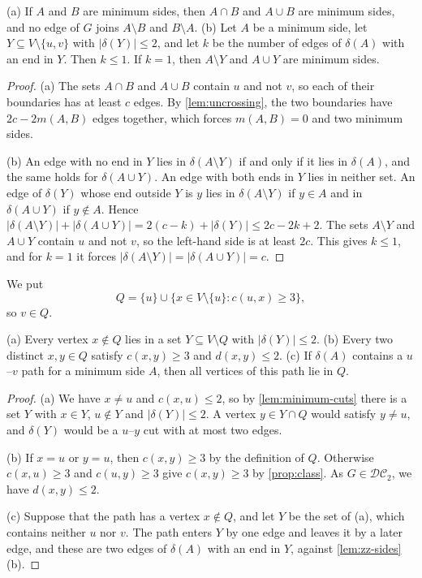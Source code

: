 \documentclass[pdflatex,sn-mathphys-num]{sn-jnl}%
\theoremstyle{thmstyleone}%
\theoremstyle{thmstyletwo}%
\theoremstyle{thmstylethree}%
\newcommand{\DC}{\mathcal{DC}_2}%
\begin{document}
\begin{lemma}
\label{lem:zz-sides}
(a) If $A$ and $B$ are minimum sides, then $A \cap B$ and $A \cup B$ are minimum sides, and no edge of $G$ joins $A \setminus B$ and $B \setminus A$.
(b) Let $A$ be a minimum side, let $Y \subseteq V \setminus \{u, v\}$ with $|\delta(Y)| \leq 2$, and let $k$ be the number of edges of $\delta(A)$ with an end in $Y$.
Then $k \leq 1$.
If $k = 1$, then $A \setminus Y$ and $A \cup Y$ are minimum sides.
\end{lemma}

\begin{proof}
(a) The sets $A \cap B$ and $A \cup B$ contain $u$ and not $v$, so each of their boundaries has at least $c$ edges.
By \cref{lem:uncrossing}, the two boundaries have $2c - 2m(A, B)$ edges together, which forces $m(A, B) = 0$ and two minimum sides.

(b) An edge with no end in $Y$ lies in $\delta(A \setminus Y)$ if and only if it lies in $\delta(A)$, and the same holds for $\delta(A \cup Y)$.
An edge with both ends in $Y$ lies in neither set.
An edge of $\delta(Y)$ whose end outside $Y$ is $y$ lies in $\delta(A \setminus Y)$ if $y \in A$ and in $\delta(A \cup Y)$ if $y \notin A$.
Hence $|\delta(A \setminus Y)| + |\delta(A \cup Y)| = 2(c - k) + |\delta(Y)| \leq 2c - 2k + 2$.
The sets $A \setminus Y$ and $A \cup Y$ contain $u$ and not $v$, so the left-hand side is at least $2c$.
This gives $k \leq 1$, and for $k = 1$ it forces $|\delta(A \setminus Y)| = |\delta(A \cup Y)| = c$.
\end{proof}

We put
\[
Q = \{u\} \cup \{x \in V \setminus \{u\} : c(u, x) \geq 3\},
\]
so $v \in Q$.

\begin{lemma}
\label{lem:zz-q}
(a) Every vertex $x \notin Q$ lies in a set $Y \subseteq V \setminus Q$ with $|\delta(Y)| \leq 2$.
(b) Every two distinct $x, y \in Q$ satisfy $c(x, y) \geq 3$ and $d(x, y) \leq 2$.
(c) If $\delta(A)$ contains a $u$--$v$ path for a minimum side $A$, then all vertices of this path lie in $Q$.
\end{lemma}

\begin{proof}
(a) We have $x \neq u$ and $c(x, u) \leq 2$, so by \cref{lem:minimum-cuts} there is a set $Y$ with $x \in Y$, $u \notin Y$ and $|\delta(Y)| \leq 2$.
A vertex $y \in Y \cap Q$ would satisfy $y \neq u$, and $\delta(Y)$ would be a $u$--$y$ cut with at most two edges.

(b) If $x = u$ or $y = u$, then $c(x, y) \geq 3$ by the definition of $Q$.
Otherwise $c(x, u) \geq 3$ and $c(u, y) \geq 3$ give $c(x, y) \geq 3$ by \cref{prop:class}.
As $G \in \DC$, we have $d(x, y) \leq 2$.

(c) Suppose that the path has a vertex $x \notin Q$, and let $Y$ be the set of (a), which contains neither $u$ nor $v$.
The path enters $Y$ by one edge and leaves it by a later edge, and these are two edges of $\delta(A)$ with an end in $Y$, against \cref{lem:zz-sides}(b).
\end{proof}
\end{document}
